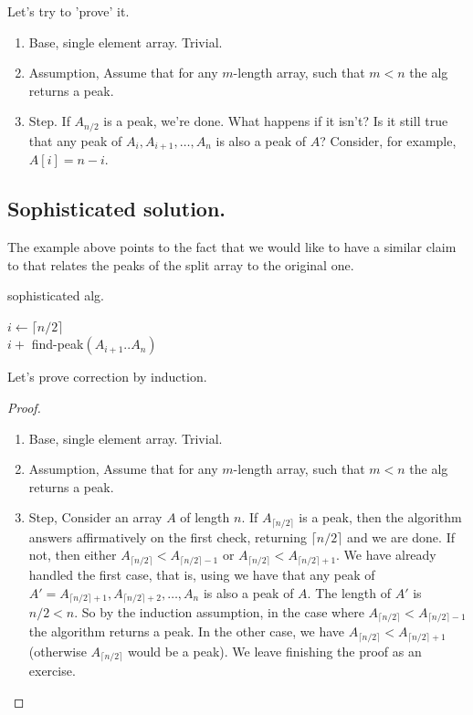 Let's try to 'prove' it.  
\begin{enumerate}
 \item Base, single element array. Trivial. 
  \item Assumption, Assume that for any $m$-length array, such that $m<n$ the alg returns a peak. 
  \item Step. If $A_{n/2}$ is a peak, we're done. What happens if it isn't? Is it still true that any peak of $A_{i},A_{i+1}, \ldots, A_{n}$ is also a peak of $A$? Consider, for example, $A[i] = n - i$.
\end{enumerate}

\subsection{Sophisticated solution.}
The example above points to the fact that we would like to have a similar claim to  that relates the peaks of the split array to the original one.  
\begin{algorithm}
\caption{sophisticated alg.}
$ i \leftarrow  \lceil n/2 \rceil $\\
         { 
          \Return $i + $ find-peak$\left(A_{i+1}..A_{n}\right)$
        }
\end{algorithm}
Let's prove correction by induction.
\begin{proof}
\begin{enumerate}
  \item Base, single element array. Trivial. 
  \item Assumption, Assume that for any $m$-length array, such that $m<n$ the alg returns a peak. 
  \item Step, Consider an array $A$ of length $n$. If $A_{\lceil n/2 \rceil}$ is a peak, then the algorithm answers affirmatively on the first check, returning $\lceil n/2 \rceil$ and we are done. If not, then either $A_{\lceil n/2 \rceil} < A_{\lceil n/2 \rceil - 1}$ or $A_{\lceil n/2 \rceil} < A_{\lceil n/2 \rceil + 1}$. We have already handled the first case, that is, using  we have that any peak of $A' = A_{\lceil n/2 \rceil + 1}, A_{\lceil n/2 \rceil + 2}, \dots, A_n$ is also a peak of $A$. The length of $A'$ is $n/2 < n$. So by the induction assumption, in the case where $A_{\lceil n/2 \rceil} < A_{\lceil n/2 \rceil - 1}$ the algorithm returns a peak. In the other case, we have $A_{\lceil n/2 \rceil} < A_{\lceil n/2 \rceil + 1}$ (otherwise $A_{\lceil n/2 \rceil}$ would be a peak). We leave finishing the proof as an exercise.
\end{enumerate}

\end{proof}


